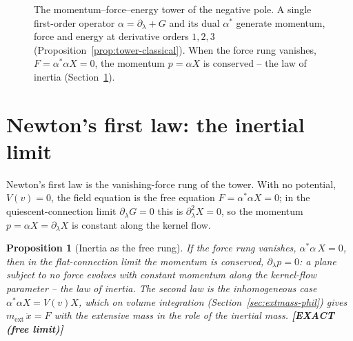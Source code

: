 \documentclass[11pt,oneside]{book}
\newcommand{\status}[1]{{\sffamily\bfseries\color{statuscol}[#1]}}
\theoremstyle{plain}
\newtheorem{proposition}[theorem]{Proposition}
\theoremstyle{definition}
\theoremstyle{remark}
\begin{document}
\begin{figure}[t]
\centering
{}
\caption{The momentum--force--energy tower of the negative pole. A single first-order
operator $\alpha=\partial_\lambda+G$ and its dual $\alpha^*$ generate momentum, force
and energy at derivative orders $1,2,3$ (Proposition~\ref{prop:tower-classical}). When
the force rung vanishes, $F=\alpha^*\alpha X=0$, the momentum $p=\alpha X$ is conserved
-- the law of inertia (Section~\ref{sec:newton-first}).}
\label{fig:tower}
\end{figure}

\section{Newton's first law: the inertial limit}
\label{sec:newton-first}

Newton's first law is the vanishing-force rung of the tower. With no potential,
$V(v)=0$, the field equation is the free equation $F=\alpha^*\alpha X=0$; in the
quiescent-connection limit $\partial_\lambda G=0$ this is $\partial_\lambda^2X=0$, so
the momentum $p=\alpha X=\partial_\lambda X$ is constant along the kernel flow.

\begin{proposition}[Inertia as the free rung]
\label{prop:newton-first}
If the force rung vanishes, $\alpha^*\alpha\,X=0$, then in the flat-connection limit
the momentum is conserved, $\partial_\lambda p=0$: a plane subject to no force evolves
with constant momentum along the kernel-flow parameter -- the law of inertia. The
second law is the inhomogeneous case $\alpha^*\alpha X=V(v)X$, which on volume
integration (Section~\ref{sec:extmass-phil}) gives $m_{\mathrm{ext}}\,\ddot x=F$ with
the extensive mass in the role of the inertial mass. \status{EXACT (free limit)}
\end{proposition}
\end{document}
